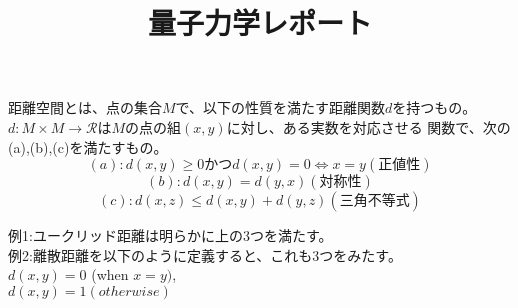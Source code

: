 \documentclass{jarticle}
\title{量子力学レポート}
\author{}
\begin{document}
\maketitle

\makeatletter
    \renewcommand{\theequation}{%
    \thesection.\arabic{equation}}
  \makeatother


距離空間とは、点の集合$M$で、以下の性質を満たす距離関数$d$を持つもの。
\\
$d:M\times M \rightarrow \mathcal{R}$は$M$の点の組$(x,y)$に対し、ある実数を対応させる
関数で、次の(a),(b),(c)を満たすもの。
\\
\begin{equation}
(a):d(x,y) \geq 0 かつ d(x,y)=0 \Leftrightarrow x = y　(正値性)
\end{equation}
\begin{equation}
(b):d(x,y) = d(y,x)　(対称性)
\end{equation}
\begin{equation}
(c):d(x,z) \leq d(x,y) + d(y,z) (三角不等式)
\end{equation}

例1:ユークリッド距離は明らかに上の3つを満たす。
\\
例2:離散距離を以下のように定義すると、これも3つをみたす。
\\
$d(x,y) = 0$ (when  $x=y)$,
\\
$d(x,y) = 1(otherwise)$ 
\end{document}
